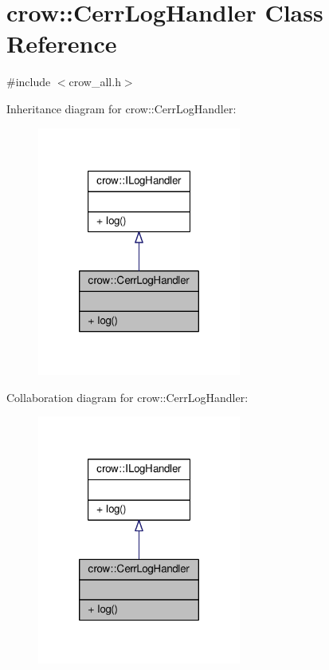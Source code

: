 \hypertarget{classcrow_1_1_cerr_log_handler}{\section{crow\-:\-:Cerr\-Log\-Handler Class Reference}
\label{classcrow_1_1_cerr_log_handler}
}


{\ttfamily \#include $<$crow\-\_\-all.\-h$>$}



Inheritance diagram for crow\-:\-:Cerr\-Log\-Handler\-:
\nopagebreak
\begin{figure}[H]
\begin{center}
\leavevmode
\includegraphics[width=190pt]{classcrow_1_1_cerr_log_handler__inherit__graph}
\end{center}
\end{figure}


Collaboration diagram for crow\-:\-:Cerr\-Log\-Handler\-:
\nopagebreak
\begin{figure}[H]
\begin{center}
\leavevmode
\includegraphics[width=190pt]{classcrow_1_1_cerr_log_handler__coll__graph}
\end{center}
\end{figure}
